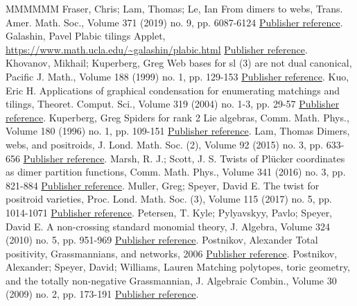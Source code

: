 \documentclass[11pt]{article}
\theoremstyle{definition}
\numberwithin{equation}{section}
\numberwithin{equation}{section}
\begin{document}
\begin{thebibliography}{MMMMMM}
 Fraser, Chris; Lam, Thomas; Le, Ian From dimers to webs, Trans. Amer. Math. Soc., Volume 371 (2019) no. 9, pp. 6087-6124 \href{https://alco.centre-mersenne.org/articles/10.5802/alco.376/#fll2019}{Publisher reference}.
 Galashin, Pavel Plabic tilings Applet, \url{https://www.math.ucla.edu/~galashin/plabic.html} \href{https://alco.centre-mersenne.org/articles/10.5802/alco.376/#applet}{Publisher reference}.
 Khovanov, Mikhail; Kuperberg, Greg Web bases for  sl (3) are not dual canonical, Pacific J. Math., Volume 188 (1999) no. 1, pp. 129-153 \href{https://alco.centre-mersenne.org/articles/10.5802/alco.376/#KhovKup}{Publisher reference}.
 Kuo, Eric H. Applications of graphical condensation for enumerating matchings and tilings, Theoret. Comput. Sci., Volume 319 (2004) no. 1-3, pp. 29-57 \href{https://alco.centre-mersenne.org/articles/10.5802/alco.376/#kuo04}{Publisher reference}.
 Kuperberg, Greg Spiders for rank 2 Lie algebras, Comm. Math. Phys., Volume 180 (1996) no. 1, pp. 109-151 \href{https://alco.centre-mersenne.org/articles/10.5802/alco.376/#kup96}{Publisher reference}.
 Lam, Thomas Dimers, webs, and positroids, J. Lond. Math. Soc. (2), Volume 92 (2015) no. 3, pp. 633-656 \href{https://alco.centre-mersenne.org/articles/10.5802/alco.376/#lam2015}{Publisher reference}.
 Marsh, R. J.; Scott, J. S. Twists of Plücker coordinates as dimer partition functions, Comm. Math. Phys., Volume 341 (2016) no. 3, pp. 821-884 \href{https://alco.centre-mersenne.org/articles/10.5802/alco.376/#marshscott2016}{Publisher reference}.
 Muller, Greg; Speyer, David E. The twist for positroid varieties, Proc. Lond. Math. Soc. (3), Volume 115 (2017) no. 5, pp. 1014-1071 \href{https://alco.centre-mersenne.org/articles/10.5802/alco.376/#mullerspeyer}{Publisher reference}.
 Petersen, T. Kyle; Pylyavskyy, Pavlo; Speyer, David E. A non-crossing standard monomial theory, J. Algebra, Volume 324 (2010) no. 5, pp. 951-969 \href{https://alco.centre-mersenne.org/articles/10.5802/alco.376/#PPS}{Publisher reference}.
 Postnikov, Alexander Total positivity, Grassmannians, and networks, 2006 \href{https://alco.centre-mersenne.org/articles/10.5802/alco.376/#p06}{Publisher reference}.
 Postnikov, Alexander; Speyer, David; Williams, Lauren Matching polytopes, toric geometry, and the totally non-negative Grassmannian, J. Algebraic Combin., Volume 30 (2009) no. 2, pp. 173-191 \href{https://alco.centre-mersenne.org/articles/10.5802/alco.376/#PSW}{Publisher reference}.

\end{thebibliography}
\end{document}
